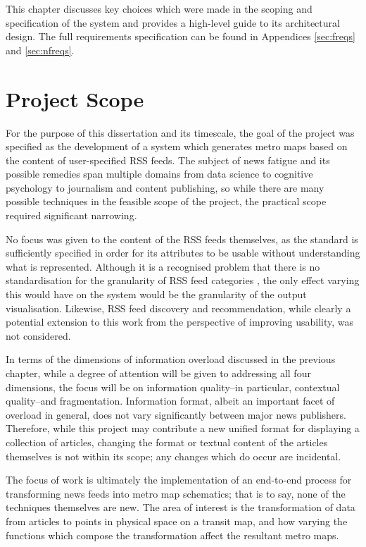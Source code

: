 This chapter discusses key choices which were made in the scoping and specification of the system and provides a high-level guide to its architectural design. The full requirements specification can be found in Appendices \ref{sec:freqs} and \ref{sec:nfreqs}.

\section{Project Scope}

For the purpose of this dissertation and its timescale, the goal of the project was specified as the development of a system which generates metro maps based on the content of user-specified RSS feeds. The subject of news fatigue and its possible remedies span multiple domains from data science to cognitive psychology to journalism and content publishing, so while there are many possible techniques in the feasible scope of the project, the practical scope required significant narrowing.

No focus was given to the content of the RSS feeds themselves, as the standard is sufficiently specified in order for its attributes to be usable without understanding what is represented. Although it is a recognised problem that there is no standardisation for the granularity of RSS feed categories \citep{PersonalNewsRss}, the only effect varying this would have on the system would be the granularity of the output visualisation. Likewise, RSS feed discovery and recommendation, while clearly a potential extension to this work from the perspective of improving usability, was not considered.

In terms of the dimensions of information overload \citep{TowardsAnOptimalResolutionToInformationOverload} discussed in the previous chapter, while a degree of attention will be given to addressing all four dimensions, the focus will be on information quality--in particular, contextual quality--and fragmentation. Information format, albeit an important facet of overload in general, does not vary significantly between major news publishers. Therefore, while this project may contribute a new unified format for displaying a collection of articles, changing the format or textual content of the articles themselves is not within its scope; any changes which do occur are incidental.

The focus of work is ultimately the implementation of an end-to-end process for transforming news feeds into metro map schematics; that is to say, none of the techniques themselves are new. The area of interest is the transformation of data from articles to points in physical space on a transit map, and how varying the functions which compose the transformation affect the resultant metro maps.

